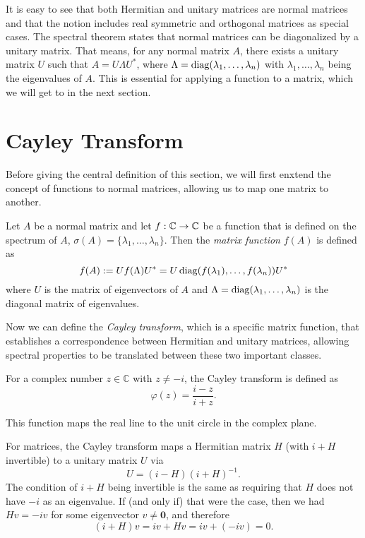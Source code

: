 It is easy to see that both Hermitian and unitary matrices are normal matrices
and that the notion includes real symmetric and orthogonal matrices as special cases.
The spectral theorem states that normal matrices can be diagonalized by a unitary matrix.
That means, for any normal matrix $A$, there exists a unitary matrix $U$ such that $A = U \Lambda U^*$,
where $\Lambda = \operatorname{diag}(\lambda_1, \ldots, \lambda_n)$ with $\lambda_1, \ldots, \lambda_n$ being the eigenvalues of $A$.
This is essential for applying a function to a matrix, which we will get to in the next section.

\section{Cayley Transform}

Before giving the central definition of this section,
we will first enxtend the concept of functions to normal matrices,
allowing us to map one matrix to another.

\begin{definition}
    Let $A$ be a normal matrix and let $f: \mathbb{C} \to \mathbb{C}$ be a function that is defined on the spectrum of $A$,
    $\sigma(A) = \{\lambda_1, \ldots, \lambda_n\}$.
    Then the \emph{matrix function} $f(A)$ is defined as
    \[
    f(A) := U f(\Lambda) U^* = U \operatorname{diag}(f(\lambda_1), \ldots, f(\lambda_n)) U^*
    \]
    where $U$ is the matrix of eigenvectors of $A$ and $\Lambda = \operatorname{diag}(\lambda_1, \ldots, \lambda_n)$ is the diagonal matrix of eigenvalues.
\end{definition}

Now we can define the \emph{Cayley transform}, which is a specific matrix function, 
that establishes a correspondence between Hermitian and unitary matrices,
allowing spectral properties to be translated between these two important classes.

For a complex number $z \in \mathbb{C}$ with $z \neq -i$, the Cayley transform is defined as
\[
\varphi(z) = \frac{i - z}{i + z}.
\]

This function maps the real line to the unit circle in the complex plane.

\vspace{0.5cm}



For matrices, the Cayley transform maps a Hermitian matrix $H$ (with $i + H$ invertible) to a unitary matrix $U$ via
\[
U = (i - H)(i + H)^{-1}.
\]
The condition of $i + H$ being invertible is the same as requiring that $H$ does not have $-i$ as an eigenvalue.
If (and only if) that were the case, then we had $H v = -i v$ for some eigenvector $v \neq \mathbf{0}$,
and therefore 
\[
(i + H) v = i v + H v = i v + (-i v) = 0.
\]

